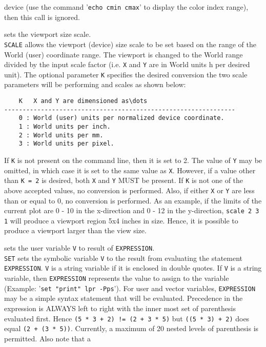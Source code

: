 	device (use the command '{\tt echo cmin cmax}'
	to display the color index range), then this call is ignored.
\item [{\tt SCALE X [Y [K]] } --] sets the viewport size scale.\\
	{\tt SCALE} allows the viewport (device) size scale to be
	set based on the range of the World (user) coordinate range.  The
	viewport is changed to the World range divided by the input scale
	factor (i.e. {\tt X} and {\tt Y} are in World units h
	per desired unit).  The optional parameter {\tt K} specifies
	the desired conversion the two scale parameters will be performing
	and scales as shown below:
	\begin{verbatim}
    K   X and Y are dimensioned as\dots
---------------------------------------------------------------
    0 : World (user) units per normalized device coordinate.
    1 : World units per inch.
    2 : World units per mm.
    3 : World units per pixel.
	\end{verbatim}
	If {\tt K} is not present on the command line, then it is
	set to 2.  The value of {\tt Y} may be omitted, in which
	case it is set to the same value as {\tt X}.  However,
	if a value other than {\tt K = 2} is desired, both
	{\tt X} and {\tt Y} MUST be present.  If {\tt K}
	is not one of the above accepted values, no conversion is performed.
	Also, if either {\tt X} or {\tt Y} are less than
	or equal to 0, no conversion is performed.  As an example,
	if the limits of the current plot are 0 - 10 in the x-direction and
	0 - 12 in the y-direction, {\tt scale 2 3 1} will produce
	a viewport region 5x4 inches in size.  Hence, it is possible to
	produce a viewport larger than the view size.
\item [{\tt SET V EXPRESSION } --] sets the user variable {\tt V} to result of {\tt EXPRESSION}.\\
	{\tt SET} sets the symbolic variable {\tt V} to the
	result from evaluating the statement {\tt EXPRESSION}.
	{\tt V} is a string variable if it is enclosed in
	double quotes.  If {\tt V} is a string variable, then
	{\tt EXPRESSION} represents the value to assign to the
	variable (Example: '{\tt set "print" lpr -Pps}').  For
	user and vector variables, {\tt EXPRESSION} may be a
	simple syntax statement that will be evaluated.  Precedence in
	the expression is ALWAYS left to right with the inner most set
	of parenthesis evaluated first.  Hence
	{\tt (5 * 3 + 2) != (2 + 3 * 5)} but {\tt ((5 * 3) + 2)}
	does equal {\tt (2 + (3 * 5))}.  Currently, a maximum of
	20 nested levels of parenthesis is permitted.  Also note that a
